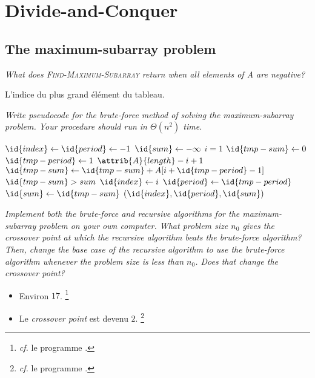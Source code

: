 \section{Divide-and-Conquer}

\subsection{The maximum-subarray problem}

\begin{description}
   {\itshape What does {\scshape Find-Maximum-Subarray} return when all elements of A are negative?} 
    \begin{ex}
      L'indice du plus grand élément du tableau.
    \end{ex}

   {\itshape Write pseudocode for the brute-force method of solving the maximum-subarray problem. Your procedure should run in $\Theta(n^2)$ time.}

    \begin{ex}
      \begin{codebox}
        \li $\id{index} \gets  \id{period} \gets -1$
        \li $\id{sum} \gets -\infty$
        \li \For $i=1$ \To {} \Do
        \li $\id{tmp-sum} \gets 0$
        \li \For $\id{tmp-period} \gets 1$ \To $\attrib{A}{length} - i+1$ \Do
        \li $\id{tmp-sum} \gets \id{tmp-sum} + A[i + \id{tmp-period}-1]$
        \li \If $\id{tmp-sum} > sum$ \Then
        \li $\id{index} \gets i$
        \li $\id{period} \gets \id{tmp-period} $
        \li $\id{sum} \gets \id{tmp-sum}$ \End \End \End
        \li \Return $(\id{index}, \id{period}, \id{sum})$
      \end{codebox}
    \end{ex}

   {\itshape Implement both the brute-force and recursive algorithms for the maximum-subarray problem on your own computer. What problem size $n_0$ gives the crossover point at which the recursive algorithm beats the brute-force algorithm? Then, change the base case of the recursive algorithm to use the brute-force algorithm whenever the problem size is less than $n_0$. Does that change the crossover point?}
    \begin{ex}
        \begin{itemize}
          \item Environ $17$. \footnote{\textit{cf.} le programme .}
          \item Le {\itshape crossover point} est devenu $2$. \footnote{\textit{cf.} le programme .}
        \end{itemize}
    \end{ex}


\end{description}
